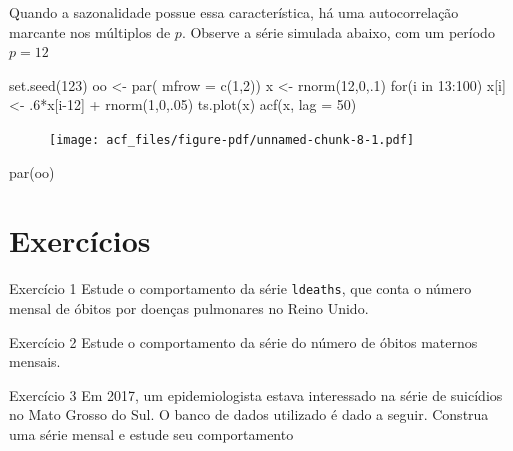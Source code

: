 \documentclass[
  letterpaper,
  DIV=11,
  numbers=noendperiod]{scrreprt}
\newenvironment{Shaded}{\begin{snugshade}}{\end{snugshade}}
\newcommand{\AttributeTok}[1]{\textcolor[rgb]{0.40,0.45,0.13}{#1}}
\newcommand{\ControlFlowTok}[1]{\textcolor[rgb]{0.00,0.23,0.31}{#1}}
\newcommand{\DecValTok}[1]{\textcolor[rgb]{0.68,0.00,0.00}{#1}}
\newcommand{\FunctionTok}[1]{\textcolor[rgb]{0.28,0.35,0.67}{#1}}
\newcommand{\NormalTok}[1]{\textcolor[rgb]{0.00,0.23,0.31}{#1}}
\newcommand{\OtherTok}[1]{\textcolor[rgb]{0.00,0.23,0.31}{#1}}
\newcommand{\SpecialCharTok}[1]{\textcolor[rgb]{0.37,0.37,0.37}{#1}}
\begin{document}
Quando a sazonalidade possue essa característica, há uma autocorrelação
marcante nos múltiplos de \(p\). Observe a série simulada abaixo, com um
período \(p=12\)

\begin{Shaded}
\begin{Highlighting}[]
\FunctionTok{set.seed}\NormalTok{(}\DecValTok{123}\NormalTok{)}
\NormalTok{oo }\OtherTok{\textless{}{-}} \FunctionTok{par}\NormalTok{( }\AttributeTok{mfrow =} \FunctionTok{c}\NormalTok{(}\DecValTok{1}\NormalTok{,}\DecValTok{2}\NormalTok{))}
\NormalTok{x }\OtherTok{\textless{}{-}} \FunctionTok{rnorm}\NormalTok{(}\DecValTok{12}\NormalTok{,}\DecValTok{0}\NormalTok{,.}\DecValTok{1}\NormalTok{)}
\ControlFlowTok{for}\NormalTok{(i }\ControlFlowTok{in} \DecValTok{13}\SpecialCharTok{:}\DecValTok{100}\NormalTok{) x[i] }\OtherTok{\textless{}{-}}\NormalTok{ .}\DecValTok{6}\SpecialCharTok{*}\NormalTok{x[i}\DecValTok{{-}12}\NormalTok{] }\SpecialCharTok{+} \FunctionTok{rnorm}\NormalTok{(}\DecValTok{1}\NormalTok{,}\DecValTok{0}\NormalTok{,.}\DecValTok{05}\NormalTok{)}
\FunctionTok{ts.plot}\NormalTok{(x)}
\FunctionTok{acf}\NormalTok{(x, }\AttributeTok{lag =} \DecValTok{50}\NormalTok{)}
\end{Highlighting}
\end{Shaded}

\begin{figure}[H]

{\centering \texttt{[image: acf\_files/figure-pdf/unnamed-chunk-8-1.pdf]}

}

\end{figure}

\begin{Shaded}
\begin{Highlighting}[]
\FunctionTok{par}\NormalTok{(oo)}
\end{Highlighting}
\end{Shaded}

\hypertarget{exercuxedcios}{%
\section{Exercícios}\label{exercuxedcios}}

Exercício 1 Estude o comportamento da série \texttt{ldeaths}, que conta
o número mensal de óbitos por doenças pulmonares no Reino Unido.

Exercício 2 Estude o comportamento da série do número de óbitos maternos
mensais.

Exercício 3 Em 2017, um epidemiologista estava interessado na série de
suicídios no Mato Grosso do Sul. O banco de dados utilizado é dado a
seguir. Construa uma série mensal e estude seu comportamento
\end{document}
